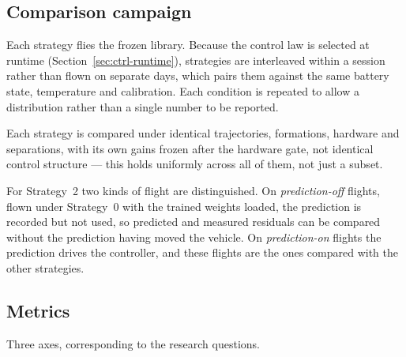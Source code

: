 \subsection{Comparison campaign}
\label{sec:setup-campaign}

Each strategy flies the frozen library. Because the control law is selected at runtime
(Section~\ref{sec:ctrl-runtime}), strategies are interleaved within a session rather than flown on
separate days, which pairs them against the same battery state, temperature and calibration.
Each condition is repeated to allow a distribution rather than a single number to be reported.

Each strategy is compared under identical trajectories, formations, hardware and separations, with
its own gains frozen after the hardware gate, not identical control structure — this holds
uniformly across all of them, not just a subset.

For Strategy~2 two kinds of flight are distinguished. On \emph{prediction-off} flights, flown
under Strategy~0 with the trained weights loaded, the prediction is recorded but not used, so
predicted and measured residuals can be compared without the prediction having moved the vehicle.
On \emph{prediction-on} flights the prediction drives the controller, and these flights are the
ones compared with the other strategies.

\subsection{Metrics}
\label{sec:setup-metrics}

Three axes, corresponding to the research questions.

